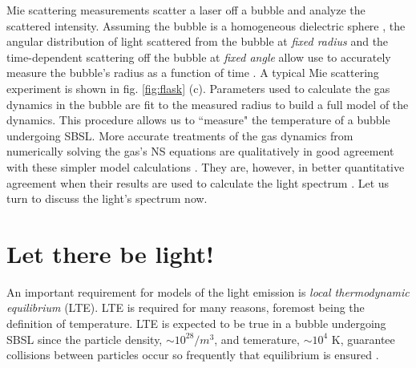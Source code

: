 \documentclass[11pt,prb,aps,nofootinbib,superscriptaddress,floatfix]{revtex4-2}
\begin{document}
Mie scattering measurements scatter a laser off a bubble and analyze the scattered intensity. Assuming the bubble is a homogeneous dielectric sphere \cite{jackson1999classical}, the angular distribution of light scattered from the bubble at \emph{fixed radius} and the time-dependent scattering off the bubble at \emph{fixed angle} allow use to accurately measure the bubble's radius as a function of time \cite{brenner2002single}. A typical Mie scattering experiment is shown in fig. \ref{fig:flask} (c). Parameters used to calculate the gas dynamics in the bubble are fit to the measured radius to build a full model of the dynamics. This procedure allows us to ``measure" the temperature of a bubble undergoing SBSL. More accurate treatments of the gas dynamics from numerically solving the gas's NS equations are qualitatively in good agreement with these simpler model calculations \cite{brenner2002single,yasui2018acoustic}. They are, however, in better quantitative agreement when their results are used to calculate the light spectrum \cite{an2009diagnosing,an2008spectral,an2006mechanism,flannigan2005plasma,flannigan2006measurement,suslick2008inside}. Let us turn to discuss the light's spectrum now.

\section{Let there be light!}
An important requirement for models of the light emission is \emph{local thermodynamic equilibrium} (LTE). LTE is required for many reasons, foremost being the definition of temperature. LTE is expected to be true in a bubble undergoing SBSL since the particle density, $\sim 10^{28}/m^3$, and temerature, $\sim 10^4$ K, guarantee collisions between particles occur so frequently that equilibrium is ensured \cite{brenner2002single,hilgenfeldt1999sonoluminescence,yasui1999mechanism}.
\end{document}

